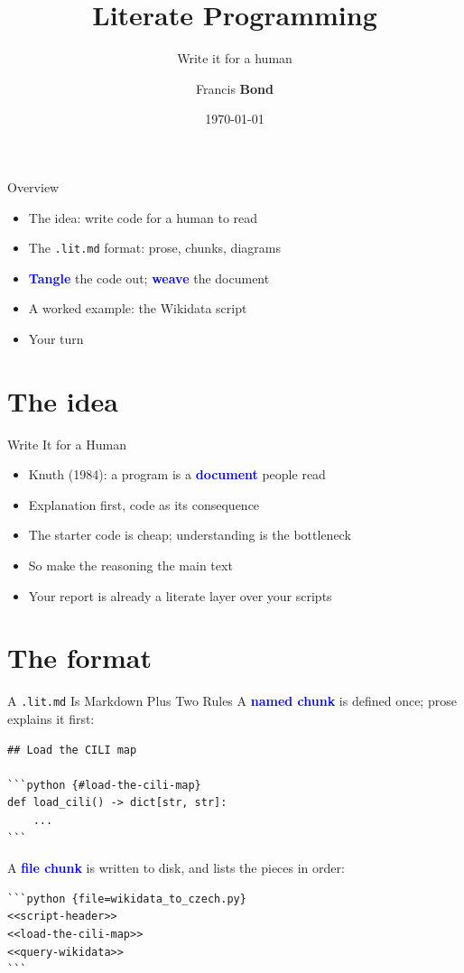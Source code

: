 \documentclass[xetex,aspectratio=169]{beamer}
\title[Literate Programming]{Literate Programming}
\subtitle{Write it for a human}
\author[Bond]{Francis \textbf{Bond}}
\institute[Palack\'y]{\href{https://bond-lab.github.io/}{Computational Linguistics Lab}
\\[1ex] Palack\'y University, Olomouc, Czechia
\\[1ex] JPC3 --- Improving the Czech Wordnet}
\date{\today}
\newcommand{\txx}[1]{\textbf{\textcolor{blue}{#1}}}
\begin{document}
\maketitle

\begin{frame}{Overview}
  \begin{itemize}
  \item The idea: write code for a human to read
  \item The \texttt{.lit.md} format: prose, chunks, diagrams
  \item \txx{Tangle} the code out; \txx{weave} the document
  \item A worked example: the Wikidata script
  \item Your turn
  \end{itemize}
\end{frame}

\section{The idea}

\begin{frame}{Write It for a Human}
  \begin{itemize}
  \item Knuth (1984): a program is a \txx{document} people read
  \item Explanation first, code as its consequence
  \item The starter code is cheap; understanding is the bottleneck
  \item So make the reasoning the main text
  \item Your report is already a literate layer over your scripts
  \end{itemize}
\end{frame}

\section{The format}

\begin{frame}[fragile]{A \texttt{.lit.md} Is Markdown Plus Two Rules}
  A \txx{named chunk} is defined once; prose explains it first:
\begin{verbatim}
## Load the CILI map

```python {#load-the-cili-map}
def load_cili() -> dict[str, str]:
    ...
```
\end{verbatim}
  A \txx{file chunk} is written to disk, and lists the pieces in order:
\begin{verbatim}
```python {file=wikidata_to_czech.py}
<<script-header>>
<<load-the-cili-map>>
<<query-wikidata>>
```
\end{verbatim}
\end{frame}
\end{document}
